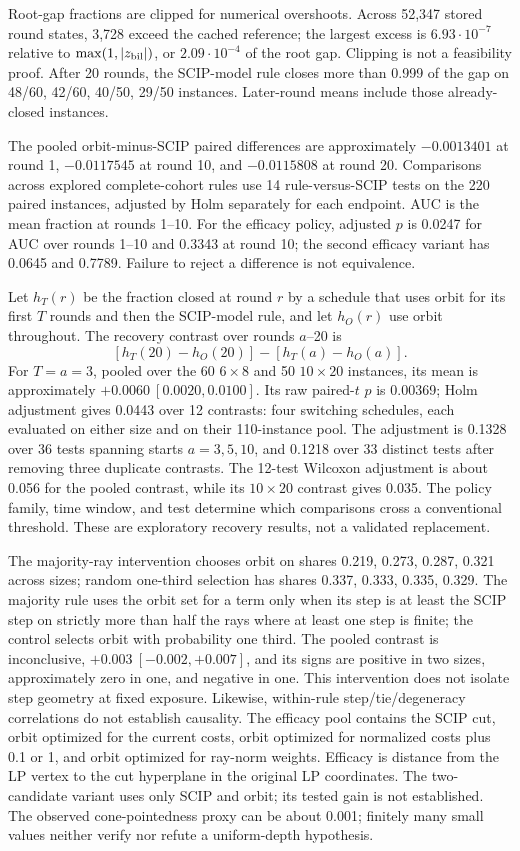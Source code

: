 Root-gap fractions are clipped for numerical overshoots. Across 52,347
stored round states, 3,728 exceed the cached reference; the largest excess
is $6.93\cdot 10^{-7}$ relative to $\max(1,|z_{\rm bil}|)$, or
$2.09\cdot 10^{-4}$ of the root gap. Clipping is not a feasibility proof.
After 20 rounds, the SCIP-model rule closes more than 0.999 of the gap
on 48/60, 42/60, 40/50, 29/50 instances. Later-round means include those
already-closed instances.

The pooled orbit-minus-SCIP paired differences are approximately
$-0.0013401$ at round 1, $-0.0117545$ at round 10, and $-0.0115808$
at round 20. Comparisons across explored complete-cohort rules use
14 rule-versus-SCIP tests on the 220 paired instances, adjusted by Holm
separately for each endpoint. AUC is the mean fraction at rounds 1--10.
For the efficacy policy, adjusted $p$ is 0.0247
for AUC over rounds 1--10 and 0.3343 at round 10; the second efficacy
variant has 0.0645 and 0.7789. Failure to reject a difference is not
equivalence.

Let $h_T(r)$ be the fraction closed at round $r$ by a schedule that uses
orbit for its first $T$ rounds and then the SCIP-model rule, and let
$h_O(r)$ use orbit throughout. The recovery contrast over rounds
$a$--20 is
\[
 [h_T(20)-h_O(20)]-[h_T(a)-h_O(a)].
\]
For $T=a=3$, pooled over the 60 $6\times 8$ and 50 $10\times 20$
instances, its mean is approximately $+0.0060\ [0.0020, 0.0100]$.
Its raw paired-$t$ $p$ is 0.00369; Holm adjustment gives 0.0443
over 12 contrasts: four switching schedules, each evaluated on either
size and on their 110-instance pool. The adjustment is 0.1328 over
36 tests spanning starts $a=3, 5, 10$, and 0.1218 over 33 distinct tests after removing
three duplicate contrasts. The 12-test Wilcoxon adjustment is about
0.056 for the pooled contrast, while its $10\times 20$ contrast gives
0.035. The policy family, time window, and test determine which
comparisons cross a conventional threshold. These are exploratory
recovery results, not a validated replacement.

The majority-ray intervention chooses orbit on shares
0.219, 0.273, 0.287, 0.321 across sizes; random one-third selection has
shares 0.337, 0.333, 0.335, 0.329. The majority rule uses the orbit
set for a term only when its step is at least the SCIP step on strictly
more than half the rays where at least one step is finite; the control
selects orbit with probability one third. The pooled contrast is inconclusive,
$+0.003\ [-0.002,+0.007]$, and its signs are positive in two sizes,
approximately zero in one, and negative in one. This intervention
does not isolate step geometry at fixed exposure. Likewise,
within-rule step/tie/degeneracy correlations do not establish causality.
The efficacy pool contains the SCIP cut, orbit optimized for the current
costs, orbit optimized for normalized costs plus 0.1 or 1, and orbit
optimized for ray-norm weights. Efficacy is distance from the LP vertex
to the cut hyperplane in the original LP coordinates. The two-candidate
variant uses only SCIP and orbit; its tested gain is not established.
The observed cone-pointedness proxy can be about 0.001; finitely many
small values neither verify nor refute a uniform-depth hypothesis.

